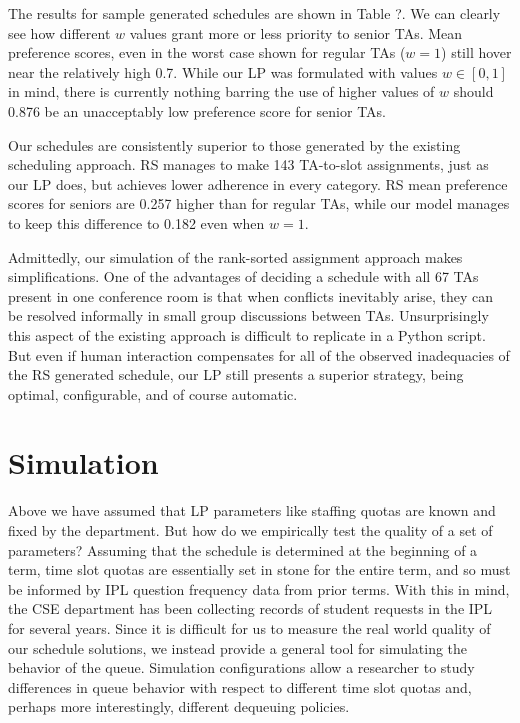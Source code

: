 \documentclass{article}
\begin{document}
\begin{multicols}{2}
The results for sample generated schedules are shown in Table ?. We can clearly see how different $w$ values grant more or less priority to senior TAs. Mean preference scores, even in the worst case shown for regular TAs ($w = 1$) still hover near the relatively high 0.7. While our LP was formulated with values $w \in [0,1]$ in mind, there is currently nothing barring the use of higher values of $w$ should 0.876 be an unacceptably low preference score for senior TAs.

Our schedules are consistently superior to those generated by the existing scheduling approach. RS manages to make 143 TA-to-slot assignments, just as our LP does, but achieves lower adherence in every category. RS mean preference scores for seniors are 0.257 higher than for regular TAs, while our model manages to keep this difference to 0.182 even when $w=1$.

Admittedly, our simulation of the rank-sorted assignment approach makes simplifications. One of the advantages of deciding a schedule with all 67 TAs present in one conference room is that when conflicts inevitably arise, they can be resolved informally in small group discussions between TAs. Unsurprisingly this aspect of the existing approach is difficult to replicate in a Python script. But even if human interaction compensates for all of the observed inadequacies of the RS generated schedule, our LP still presents a superior strategy, being optimal, configurable, and of course automatic.

\section*{Simulation}

Above we have assumed that LP parameters like staffing quotas are known and fixed by the department. But how do we empirically test the quality of a set of parameters? Assuming that the schedule is determined at the beginning of a term, time slot quotas are essentially set in stone for the entire term, and so must be informed by IPL question frequency data from prior terms. With this in mind, the CSE department has been collecting records of student requests in the IPL for several years. Since it is difficult for us to measure the real world quality of our schedule solutions, we instead provide a general tool for simulating the behavior of the queue. Simulation configurations allow a researcher to study differences in queue behavior with respect to different time slot quotas and, perhaps more interestingly, different dequeuing policies.


\end{multicols}
\end{document}
